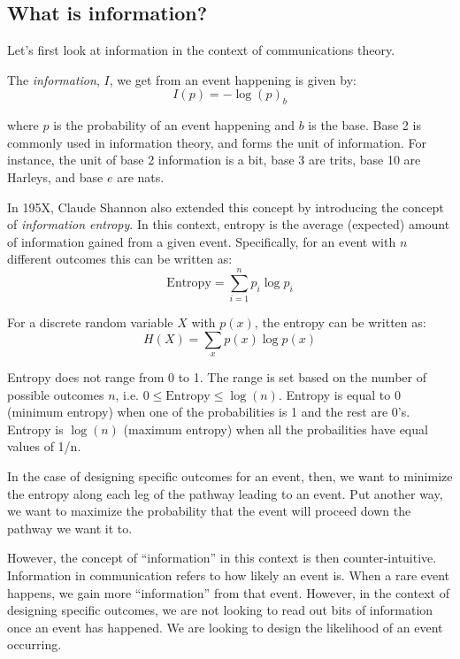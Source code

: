 \subsection{What is information?}

Let's first look at information in the context of communications theory.

The \textit{information}, $I$, we get from an event happening is given by:
\begin{equation}
I(p) = -\log{(p)}_b
\end{equation}

where $p$ is the probability of an event happening and $b$ is the base.
Base 2 is commonly used in information theory, and forms the unit of information.
For instance, the unit of base 2 information is a bit, base 3 are trits, base 10 are Harleys, and base $e$ are nats.

In 195X, Claude Shannon also extended this concept by introducing the concept of \textit{information entropy}.
In this context, entropy is the average (expected) amount of information gained from a given event.
Specifically, for an event with $n$ different outcomes this can be written as:
\begin{equation}
\text{Entropy} = \sum_{i=1}^{n}p_i\log{p_i}
\end{equation} 

For a discrete random variable $X$ with $p(x)$, the entropy can be written as:
\begin{equation}
H(X) = \sum_x p(x)\log{p(x)}
\end{equation}


Entropy does not range from 0 to 1.
The range is set based on the number of possible outcomes $n$, i.e. $0\leq\text{Entropy}\leq\log{(n)}$.
Entropy is equal to 0 (minimum entropy) when one of the probabilities is 1 and the rest are 0's.
Entropy is $\log{(n)}$ (maximum entropy) when all the probailities have equal values of 1/n.

In the case of designing specific outcomes for an event, then, we want to minimize the entropy along each leg of the pathway leading to an event.
Put another way, we want to maximize the probability that the event will proceed down the pathway we want it to.

However, the concept of ``information'' in this context is then counter-intuitive.
Information in communication refers to how likely an event is.
When a rare event happens, we gain more ``information'' from that event.
However, in the context of designing specific outcomes, we are not looking to read out bits of information once an event has happened.
We are looking to design the likelihood of an event occurring.

